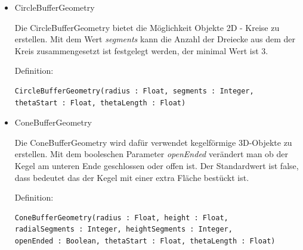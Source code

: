\begin{itemize}
\item CircleBufferGeometry 
  
Die CircleBufferGeometry bietet die Möglichkeit Objekte 2D - Kreise zu erstellen. Mit dem Wert \textit{segments} kann die Anzahl der Dreiecke aus dem der Kreis zusammengesetzt ist festgelegt werden, der minimal Wert ist 3.

Definition:
\begin{lstlisting}
CircleBufferGeometry(radius : Float, segments : Integer,
thetaStart : Float, thetaLength : Float)
\end{lstlisting}

\item ConeBufferGeometry 
  
Die ConeBufferGeometry wird dafür verwendet kegelförmige 3D-Objekte zu erstellen. 
Mit dem booleschen Parameter \textit{openEnded} verändert man ob der Kegel am unteren Ende geschlossen oder offen ist. Der Standardwert ist false, dass bedeutet das der Kegel mit einer extra Fläche bestückt ist.

Definition:
\begin{lstlisting}
ConeBufferGeometry(radius : Float, height : Float,
radialSegments : Integer, heightSegments : Integer,
openEnded : Boolean, thetaStart : Float, thetaLength : Float)
\end{lstlisting}
\newpage


\end{itemize}
